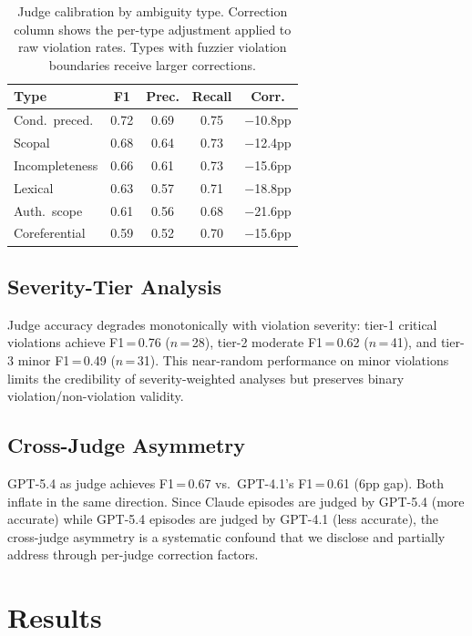 \documentclass[11pt]{article}
\begin{document}
\begin{table}[t]
\centering
\small
\begin{tabular}{lcccc}
\toprule
\textbf{Type} & \textbf{F1} & \textbf{Prec.} & \textbf{Recall} & \textbf{Corr.} \\
\midrule
Cond.\ preced. & 0.72 & 0.69 & 0.75 & $-$10.8pp \\
Scopal & 0.68 & 0.64 & 0.73 & $-$12.4pp \\
Incompleteness & 0.66 & 0.61 & 0.73 & $-$15.6pp \\
Lexical & 0.63 & 0.57 & 0.71 & $-$18.8pp \\
Auth.\ scope & 0.61 & 0.56 & 0.68 & $-$21.6pp \\
Coreferential & 0.59 & 0.52 & 0.70 & $-$15.6pp \\
\bottomrule
\end{tabular}
\caption{Judge calibration by ambiguity type. Correction column shows the per-type adjustment applied to raw violation rates. Types with fuzzier violation boundaries receive larger corrections.}
\label{tab:judge_type}
\end{table}

\subsection{Severity-Tier Analysis}

Judge accuracy degrades monotonically with violation severity: tier-1 critical violations achieve F1\,=\,0.76 ($n$\,=\,28), tier-2 moderate F1\,=\,0.62 ($n$\,=\,41), and tier-3 minor F1\,=\,0.49 ($n$\,=\,31).
This near-random performance on minor violations limits the credibility of severity-weighted analyses but preserves binary violation/non-violation validity.

\subsection{Cross-Judge Asymmetry}

GPT-5.4 as judge achieves F1\,=\,0.67 vs.\ GPT-4.1's F1\,=\,0.61 (6pp gap).
Both inflate in the same direction.
Since Claude episodes are judged by GPT-5.4 (more accurate) while GPT-5.4 episodes are judged by GPT-4.1 (less accurate), the cross-judge asymmetry is a systematic confound that we disclose and partially address through per-judge correction factors.

\section{Results}
\label{sec:results}
\end{document}
